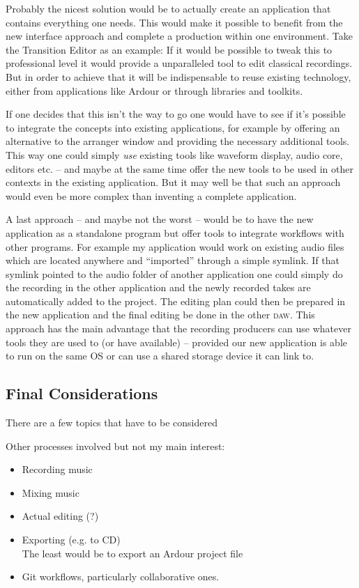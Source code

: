 \documentclass[11pt,a4paper]{article}
\begin{document}
Probably the nicest solution would be to actually create an application that contains everything one needs.
This would make it possible to benefit from the new interface approach and complete a production within one environment.
Take the Transition Editor as an example: If it would be possible to tweak this to professional level it would provide a unparalleled tool to edit classical recordings.
But in order to achieve that it will be indispensable to reuse existing technology, either from applications like Ardour or through libraries and toolkits.

If one decides that this isn't the way to go one would have to see if it's possible to integrate the concepts into existing applications, for example by offering an alternative to the arranger window and providing the necessary additional tools.
This way one could simply \emph{use} existing tools like waveform display, audio core, editors etc. -- and maybe at the same time offer the new tools to be used in other contexts in the existing application.
But it may well be that such an approach would even be more complex than inventing a complete application.

A last approach -- and maybe not the worst -- would be to have the new application as a standalone program but offer tools to integrate workflows with other programs.
For example my application would work on existing audio files which are located anywhere and “imported” through a simple symlink.
If that symlink pointed to the audio folder of another application one could simply do the recording in the other application and the newly recorded takes are automatically added to the project.
The editing plan could then be prepared in the new application and the final editing be done in the other \textsc{daw}.
This approach has the main advantage that the recording producers can use whatever tools they are used to (or have available) -- provided our new application is able to run on the same OS or can use a shared storage device it can link to.

\subsection{Final Considerations}
There are a few topics that have to be considered

Other processes involved but not my main interest:

\begin{itemize}
\item Recording music
\item Mixing music
\item Actual editing (?)
\item Exporting (e.g. to CD)\\
	The least would be to export an Ardour project file
\item Git workflows, particularly collaborative ones.
\end{itemize}
\end{document}
